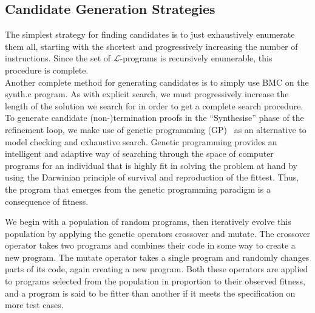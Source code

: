 \documentclass[preprint]{sigplanconf}
\theoremstyle{definition}
\begin{document}
\subsection{Candidate Generation Strategies}
 The simplest strategy for finding candidates
is to just exhaustively enumerate them all, starting with the shortest and
progressively increasing the number of instructions.  Since the set of
$\mathcal{L}$-programs is recursively enumerable, this procedure is complete.
\\

 Another complete method for generating
candidates is to simply use BMC on the {\sc synth.c} program.  As with explicit
search, we must progressively increase the length of the solution we search for
in order to get a complete search procedure.
\\

 \label{sec:gp}
To generate candidate (non-)termination proofs in the ``Synthesise'' phase
of the refinement loop, we make use of genetic programming
(GP)~\cite{langdon:fogp} as an alternative to model checking and exhaustive
search.  Genetic programming provides an intelligent and adaptive way of
searching through the space of computer programs for an individual that is
highly fit in solving the problem at hand by using the Darwinian principle
of survival and reproduction of the fittest.  Thus, the program that emerges
from the genetic programming paradigm is a consequence of fitness.

We begin with a population of random programs, then iteratively evolve this
population by applying the genetic operators {\sc crossover} and {\sc
mutate}.  The {\sc crossover} operator takes two programs and combines their
code in some way to create a new program.  The {\sc mutate} operator takes a
single program and randomly changes parts of its code, again creating a new
program.  Both these operators are applied to programs selected from the
population in proportion to their observed fitness, and a program is said to
be fitter than another if it meets the specification on more test cases.
\end{document}
